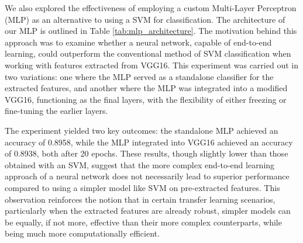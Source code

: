 We also explored the effectiveness of employing a custom Multi-Layer Perceptron (MLP) as an alternative to using a SVM for classification. The architecture of our MLP is outlined in Table \ref{tab:mlp_architecture}. The motivation behind this approach was to examine whether a neural network, capable of end-to-end learning, could outperform the conventional method of SVM classification when working with features extracted from VGG16. This experiment was carried out in two variations: one where the MLP served as a standalone classifier for the extracted features, and another where the MLP was integrated into a modified VGG16, functioning as the final layers, with the flexibility of either freezing or fine-tuning the earlier layers.

The experiment yielded two key outcomes: the standalone MLP achieved an accuracy of 0.8958, while the MLP integrated into VGG16 achieved an accuracy of 0.8938, both after 20 epochs. These results, though slightly lower than those obtained with an SVM, suggest that the more complex end-to-end learning approach of a neural network does not necessarily lead to superior performance compared to using a simpler model like SVM on pre-extracted features. This observation reinforces the notion that in certain transfer learning scenarios, particularly when the extracted features are already robust, simpler models can be equally, if not more, effective than their more complex counterparts, while being much more computationally efficient.

